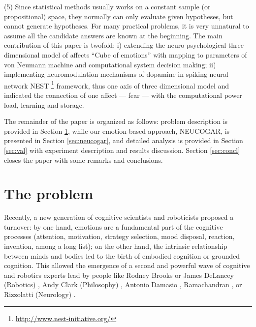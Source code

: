 \documentclass[procedia]{easychair}
\begin{document}
(5) Since statistical methods usually works on a constant sample (or propositional) space, they normally can only evaluate given hypotheses, but cannot generate hypotheses. For many practical problems, it is very unnatural to assume all the candidate answers are known at the beginning.
The main contribution of this paper is twofold:
i) extending the neuro-psychological three dimensional model of affects ``Cube of emotions''\cite{lovheim2012}
with mapping to parameters of von Neumann machine and computational system decision making;
ii) implementing neuromodulation mechanisms of dopamine in spiking neural network NEST
\footnote{\url{http://www.nest-initiative.org/}} framework, thus one axis of three dimensional model and
indicated the connection of one affect --- fear --- with the computational power load, learning and storage.

The remainder of the paper is organized as follows: problem description is provided in  Section \ref{sec:problem},
while  our emotion-based approach, NEUCOGAR, is presented in  Section \ref{sec:neucogar}, and detailed analysis is provided
in Section \ref{sec:val} with experiment description and results discussion.
Section \ref{sec:concl} closes the paper with some remarks and conclusions.

\section{The problem}
\label{sec:problem}

Recently, a new generation of cognitive scientists and roboticists proposed a turnover: by one hand, emotions
are a fundamental part of the cognitive processes (attention, motivation, strategy selection, mood disposal,
reaction, invention, among a long list); on the other hand, the intrinsic relationship between minds and bodies led to
the birth of embodied cognition or grounded cognition\cite{Barsalou2008}.
This allowed the emergence of a second and powerful wave of cognitive and robotics experts lead by people like
Rodney Brooks \cite{Brooks1991, Brooks1995} or James DeLancey (Robotics) \cite{Delancey2001}, Andy Clark (Philosophy)
\cite{Clark2003},
Antonio Damasio \cite{Damasio1999}, Ramachandran \cite{Ramachandran2004}, or Rizzolatti (Neurology) \cite{Rizzolatti2004}.
\end{document}
